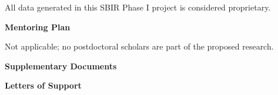\documentclass[11pt]{article}
\begin{document}
All data generated in this SBIR Phase I project is considered proprietary.








\newpage
{\bf \Huge Mentoring Plan}

Not applicable; no postdoctoral scholars are part of the proposed research.








\newpage
{\bf \Huge Supplementary Documents \\}


{\bf \Large Letters of Support}
\end{document}
